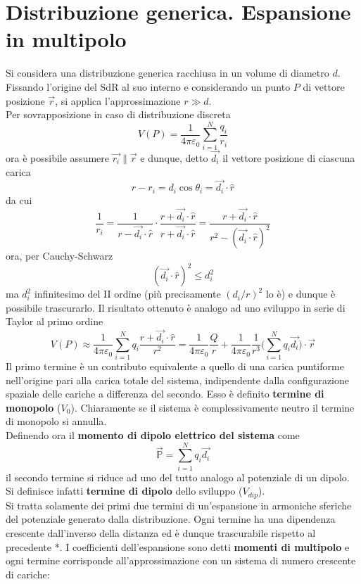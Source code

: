 \section{Distribuzione generica. Espansione in multipolo}
Si considera una distribuzione generica racchiusa in un volume di diametro $d$. Fissando l'origine del SdR al suo interno e considerando un punto $P$ di vettore posizione $\vec{r}$, si applica l'approssimazione $r \gg d$.
\\Per sovrapposizione in caso di distribuzione discreta
\[V(P) = \frac{1}{4 \pi \varepsilon_0} \sum\limits_{i=1}^{N} \frac{q_i}{r_i}\]
ora è possibile assumere $\vec{r_i} \parallel \vec{r}$ e dunque, detto $\vec{d_i}$ il vettore posizione di ciascuna carica
\[r - r_i = d_i \cos \theta_i = \vec{d_i} \cdot \hat{r}\]
da cui
\[\frac{1}{r_i} = \frac{1}{r - \vec{d_i} \cdot \hat{r}} \cdot \frac{r + \vec{d_i} \cdot \hat{r}}{r + \vec{d_i} \cdot \hat{r}} = \frac{r + \vec{d_i} \cdot \hat{r}}{r^2 - (\vec{d_i} \cdot \hat{r})^2}\]
ora, per Cauchy-Schwarz
\[(\vec{d_i} \cdot \hat{r})^2 \leq d_i^2\]
ma $d_i^2$ infinitesimo del II ordine (più precisamente $(d_i/r)^2$ lo è) e dunque è possibile trascurarlo. Il risultato ottenuto è analogo ad uno sviluppo in serie di Taylor al primo ordine
\[V(P) \approx \frac{1}{4 \pi \varepsilon_0} \sum\limits_{i=1}^{N} q_i \frac{r + \vec{d_i} \cdot \hat{r}}{r^2} = \frac{1}{4 \pi \varepsilon_0} \frac{Q}{r} + \frac{1}{4 \pi \varepsilon_0} \frac{1}{r^3} \big(\sum\limits_{i=1}^{N} q_i \vec{d_i}\big) \cdot \vec{r}\]
Il primo termine è un contributo equivalente a quello di una carica puntiforme nell'origine pari alla carica totale del sistema, indipendente dalla configurazione spaziale delle cariche a differenza del secondo. Esso è definito \textbf{termine di monopolo} ($V_0$). Chiaramente se il sistema è complessivamente neutro il termine di monopolo si annulla.
\\Definendo ora il \textbf{momento di dipolo elettrico del sistema} come
\[\vec{\mathbb{P}} = \sum\limits_{i=1}^{N} q_i \vec{d_i}\]
il secondo termine si riduce ad uno del tutto analogo al potenziale di un dipolo. Si definisce infatti \textbf{termine di dipolo} dello sviluppo ($V_{dip}$).
\\Si tratta solamente dei primi due termini di un'espansione in armoniche sferiche del potenziale generato dalla distribuzione. Ogni termine ha una dipendenza crescente dall'inverso della distanza ed è dunque trascurabile rispetto al precedente *. I coefficienti dell'espansione sono detti \textbf{momenti di multipolo} e ogni termine corrisponde all'approssimazione con un sistema di numero crescente di cariche:
